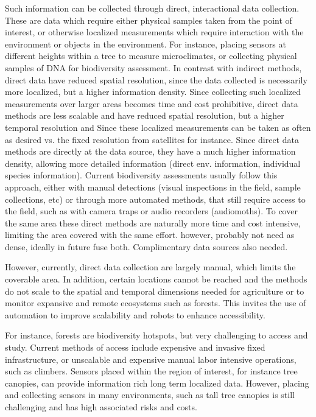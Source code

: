 Such information can be collected through direct, interactional data collection. These are data which require either physical samples taken from the point of interest, or otherwise localized measurements which require interaction with the environment or objects in the environment. For instance, placing sensors at different heights within a tree to measure microclimates, or collecting physical samples of DNA for biodiversity assessment. In contrast with indirect methods, direct data have reduced spatial resolution, since the data collected is necessarily  more localized, but a higher information density. Since collecting such localized measurements over larger areas becomes time and cost prohibitive, direct data methods are less scalable and have reduced spatial resolution, but  a higher temporal resolution and Since these localized measurements can be taken as often as desired vs. the fixed resolution from satellites for instance. Since direct data methods are directly at the data source, they have a much higher information density, allowing more detailed information (direct env. information, individual species information).
Current biodiversity assessments usually follow this approach, either with manual detections (visual inspections in the field, sample collections, etc) or through more automated methods, that still require access to the field, such as with camera traps or audio recorders (audiomoths).
To cover the same area these direct methods are naturally more time and cost intensive, limiting the area covered with the same effort. 
however, probably not need as dense, ideally in future fuse both.
 Complimentary data sources also needed. 

 However, currently, direct data collection are largely manual, which limits the coverable area. In addition, certain locations cannot be reached and the methods do not scale to the spatial and temporal dimensions needed for agriculture or to monitor expansive and remote ecosystems such as forests. This invites the use of automation to improve scalability and robots to enhance accessibility. %
 

For instance, forests are biodiversity hotspots, but very challenging to access and study. Current methods of access include expensive and invasive fixed infrastructure, or unscalable and expensive manual labor intensive operations, such as climbers. 
Sensors placed within the region of interest, for instance tree canopies, can provide information rich long term localized data. However, placing and collecting sensors in many environments, such as tall tree canopies is still challenging and has high associated risks and costs.

